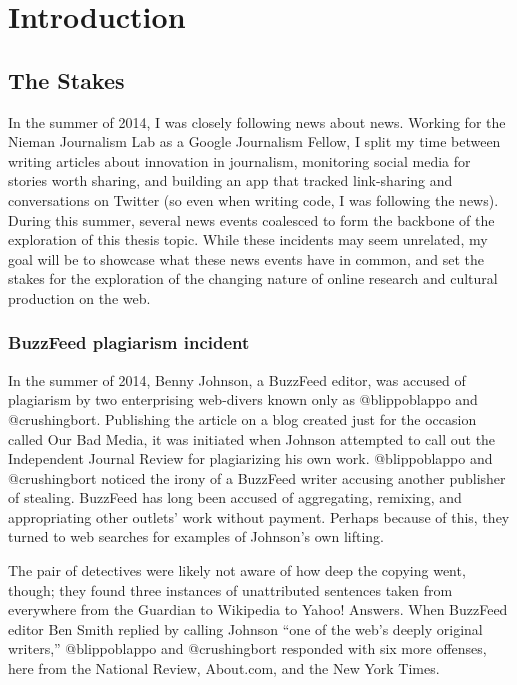 \chapter{Introduction}

\section{The Stakes}

In the summer of 2014, I was closely following news about news. Working for the Nieman Journalism Lab as a Google Journalism Fellow, I split my time between writing articles about innovation in journalism, monitoring social media for stories worth sharing, and building an app that tracked link-sharing and conversations on Twitter (so even when writing code, I was following the news). During this summer, several news events coalesced to form the backbone of the exploration of this thesis topic. While these incidents may seem unrelated, my goal will be to showcase what these news events have in common, and set the stakes for the exploration of the changing nature of online research and cultural production on the web.

\subsection{BuzzFeed plagiarism incident}

In the summer of 2014, Benny Johnson, a BuzzFeed editor, was accused of plagiarism by two enterprising web-divers known only as @blippoblappo and @crushingbort. Publishing the article on a blog created just for the occasion called Our Bad Media, it was initiated when Johnson attempted to call out the Independent Journal Review for plagiarizing his own work. @blippoblappo and @crushingbort noticed the irony of a BuzzFeed writer accusing another publisher of stealing. BuzzFeed has long been accused of aggregating, remixing, and appropriating other outlets' work without payment. Perhaps because of this, they turned to web searches for examples of Johnson's own lifting.

The pair of detectives were likely not aware of how deep the copying went, though; they found three instances of unattributed sentences taken from everywhere from the Guardian to Wikipedia to Yahoo! Answers. When BuzzFeed editor Ben Smith replied by calling Johnson ``one of the web's deeply original writers,'' @blippoblappo and @crushingbort responded with six more offenses, here from the National Review, About.com, and the New York Times.

